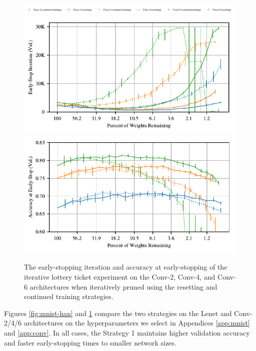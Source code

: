 \begin{figure}
\centering
\includegraphics[width=.8\textwidth]{graphs/mnist/lenet/conv-han/legend}
\includegraphics[width=.5\textwidth]{graphs/mnist/lenet/conv-han/iteration}%
\includegraphics[width=.5\textwidth]{graphs/mnist/lenet/conv-han/accuracy}
\caption{The early-stopping iteration and accuracy at early-stopping of the iterative lottery ticket experiment on the Conv-2, Conv-4, and Conv-6 architectures when iteratively
pruned using the resetting and continued training strategies.}
\label{fig:conv-han}
\end{figure}

Figures \ref{fig:mnist-han}  and \ref{fig:conv-han} compare the two strategies on the Lenet and Conv-2/4/6 architectures on the hyperparameters we select in
Appendices \ref{app:mnist} and \ref{app:conv}. In all cases, the Strategy 1 maintains higher validation accuracy and faster early-stopping times to smaller network
sizes.